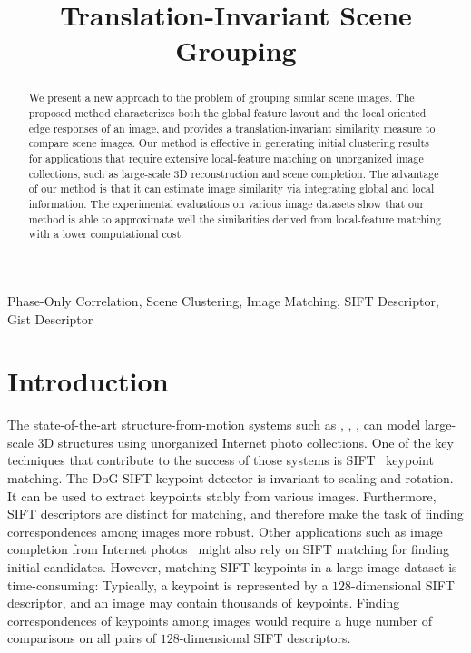 \documentclass[conference]{IEEEtran}
\begin{document}
\title{Translation-Invariant Scene Grouping}

\author{
\and
{}
}


%
\maketitle
%
\begin{abstract}
We present a new approach to the problem of grouping similar scene images. 
The proposed method characterizes both the global feature layout and the local oriented edge responses of an image, and provides a translation-invariant similarity measure to compare scene images. Our method is effective in generating initial clustering results for applications that require extensive local-feature matching on unorganized image collections, such as large-scale 3D reconstruction and scene completion. The advantage of our method is that it can estimate image similarity via integrating global and local information.
The experimental evaluations on various image datasets show that our method is able to approximate well the similarities derived from local-feature matching with a lower computational cost.
\end{abstract}
%
\begin{keywords}
Phase-Only Correlation, Scene Clustering, Image Matching, SIFT Descriptor, Gist Descriptor
\end{keywords}
%
\section{Introduction}

The state-of-the-art structure-from-motion systems such as \cite{AgarwalFSCSS10}, \cite{SnavelyGSS08}, \cite{SnavelySS06}, \cite{SnavelySS08J}
can model large-scale 3D structures using unorganized Internet photo collections. One of the key techniques that contribute to the success of those systems is SIFT~\cite{Lowe04} keypoint matching. The DoG-SIFT keypoint detector is invariant to scaling and rotation. It can be used to extract keypoints stably from various images. Furthermore, SIFT descriptors are distinct for matching, and therefore make the task of finding correspondences among images more robust. Other applications such as image completion from Internet photos~\cite{AmirshahiKIA08} might also rely on SIFT matching for finding initial candidates. However, matching SIFT keypoints in a large image dataset is time-consuming: Typically, a keypoint is represented by a $128$-dimensional SIFT descriptor, and an image may contain thousands of keypoints. Finding correspondences of keypoints among images would require a huge number of comparisons on all pairs of $128$-dimensional SIFT descriptors. 
\end{document}
